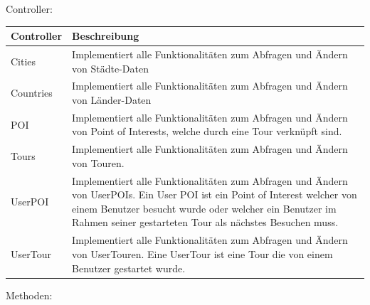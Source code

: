 \documentclass[a4paper,10pt,xetex]{article}
\begin{document}
Controller:

\begin{longtabu} to \textwidth { | l | X[l] | }
\hline
\textbf{Controller} & \textbf{Beschreibung} \\
\hline
\endhead

Cities & Implementiert alle Funktionalit\"aten zum Abfragen und \"Andern von
  St\"adte-Daten\\ \hline
Countries & Implementiert alle Funktionalit\"aten zum Abfragen und \"Andern von
  L\"ander-Daten\\ \hline
POI & Implementiert alle Funktionalit\"aten zum Abfragen und \"Andern von Point of
Interests, welche durch eine Tour verkn\"upft sind.\\\hline
Tours & Implementiert alle Funktionalit\"aten zum Abfragen und \"Andern von Touren.\\\hline
UserPOI & Implementiert alle Funktionalit\"aten zum Abfragen und \"Andern von UserPOIs.
  Ein User POI ist ein Point of Interest welcher von einem Benutzer besucht wurde oder
  welcher ein Benutzer im Rahmen seiner gestarteten Tour als n\"achstes Besuchen muss.\\\hline
UserTour & Implementiert alle Funktionalit\"aten zum Abfragen und \"Andern von UserTouren.
  Eine UserTour ist eine Tour die von einem Benutzer gestartet wurde.\\\hline
\end{longtabu}

Methoden:
\end{document}
